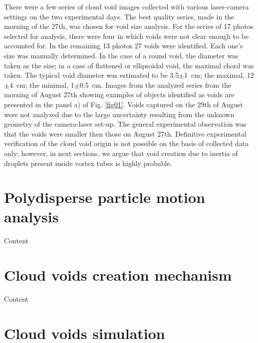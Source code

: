 \documentclass[../main.tex]{subfiles}
\begin{document}
There were a few series of cloud void images collected with various laser-camera settings on the two experimental days. The best quality series, made in the morning of the 27th, was chosen for void size analysis. For the series of 17 photos selected for analysis, there were four in which voids were not clear enough to be accounted for. In the remaining 13 photos 27 voids were identified. Each one's size was manually determined. In the case of a round void, the diameter was taken as the size; in a case of flattened or ellipsoidal void, the maximal chord was taken. The typical void diameter was estimated to be 3.5$\pm$1~cm; the maximal, 12$\pm$4~cm; the minimal, 1$\pm$0.5~cm. Images from the analyzed series from the morning of August 27th showing examples of objects identified as voids are presented in the panel a) of Fig. \ref{fig01}. Voids captured on the 29th of August were not analyzed due to the large uncertainty resulting from the unknown geometry of the camera-laser set-up. The general experimental observation was that the voids were smaller then those on August 27th. Definitive experimental verification of the cloud void origin is not possible on the basis of collected data only; however, in next sections, we argue that void creation due to inertia of droplets present inside vortex tubes is highly probable.


\section{Polydisperse particle motion analysis}

Content
\section{Cloud voids creation mechanism}
Content
\section{Cloud voids simulation}

\end{document}
